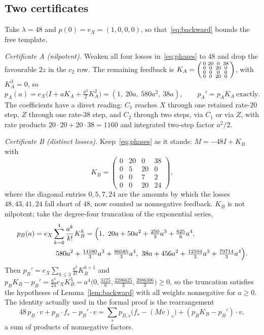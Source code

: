 \documentclass[11pt,a4paper]{article}
\theoremstyle{plain}
\theoremstyle{definition}
\theoremstyle{remark}
\begin{document}
\subsection{Two certificates}
Take $\lambda=48$ and $p(0)=e_X=(1,0,0,0)$, so that~\eqref{eq:backward} bounds the free template.

\emph{Certificate A (nilpotent).} Weaken all four losses in~\eqref{eq:phases} to $48$ and drop the favourable $2z$ in the $c_2$ row. The remaining feedback is $K_A=\begin{psmallmatrix}0&20&0&38\\0&0&20&0\\0&0&0&0\\0&0&20&0\end{psmallmatrix}$, with $K_A^3=0$, so
\begin{equation}\label{eq:pA}
p_A(a)=e_X\bigl(I+aK_A+\tfrac{a^2}2K_A^2\bigr)=(1,\ 20a,\ 580a^2,\ 38a),\qquad p_A'=p_AK_A\ \text{exactly}.
\end{equation}
The coefficients have a direct reading: $C_1$ reaches $X$ through one retained rate-$20$ step, $Z$ through one rate-$38$ step, and $C_2$ through two steps, via $C_1$ or via $Z$, with rate products $20\cdot20+20\cdot38=1160$ and integrated two-step factor $a^2/2$.

\emph{Certificate B (distinct losses).} Keep~\eqref{eq:phases} as it stands: $M=-48I+K_B$ with
\begin{equation}\label{eq:KB}
K_B=\begin{pmatrix}0&20&0&38\\0&5&20&0\\0&0&7&2\\0&0&20&24\end{pmatrix},
\end{equation}
where the diagonal entries $0,5,7,24$ are the amounts by which the losses $48,43,41,24$ fall short of $48$, now counted as nonnegative feedback. $K_B$ is not nilpotent; take the degree-four truncation of the exponential series,
\begin{equation}\label{eq:pB}
\begin{aligned}
p_B(a)&=e_X\sum_{k=0}^{4}\frac{a^k}{k!}K_B^k
=\Bigl(1,\ 20a+50a^2+\tfrac{250}{3}a^3+\tfrac{625}{6}a^4,\\
&\qquad\quad 580a^2+\tfrac{14180}{3}a^3+\tfrac{86585}{3}a^4,\ 38a+456a^2+\tfrac{12104}{3}a^3+\tfrac{79714}{3}a^4\Bigr).
\end{aligned}
\end{equation}
Then $p_B'=e_X\sum_{k\le3}\frac{a^k}{k!}K_B^{k+1}$ and $p_BK_B-p_B'=\frac{a^4}{24}e_XK_B^5=a^4\bigl(0,\frac{3125}6,\frac{2206625}3,\frac{2086306}3\bigr)\ge0$, so the truncation satisfies the hypotheses of Lemma~\ref{lem:backward} with all weights nonnegative for $a\ge0$. The identity actually used in the formal proof is the rearrangement
\[
48\,p_B\!\cdot v+p_B\!\cdot f_v-p_B'\!\cdot v=\sum_{s}p_{B,s}\bigl(f_s-(Mv)_s\bigr)+(p_BK_B-p_B')\cdot v,
\]
a sum of products of nonnegative factors.
\end{document}

